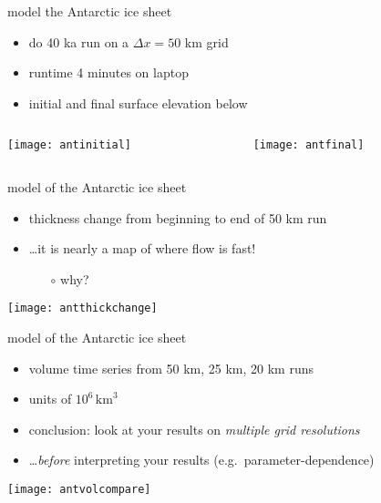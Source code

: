 \begin{frame}{model the Antarctic ice sheet }

\begin{itemize}
\item do 40 ka run on a $\Delta x=50$ km grid
\item runtime 4 minutes on laptop
\item initial and final surface elevation below
\end{itemize}

\bigskip
\begin{columns}
\begin{column}{0.4\textwidth}
\texttt{[image: antinitial]}
\end{column}
\begin{column}{0.55\textwidth}
\texttt{[image: antfinal]}
\end{column}
\end{columns}
\end{frame}


\begin{frame}{model of the Antarctic ice sheet }

\normalsize
\vspace{-5mm}
\begin{itemize}
\item thickness change from beginning to end of 50 km run
\item \dots it is nearly a map of where flow is fast!
  \begin{itemize}
  \item[$\circ$] why?
  \end{itemize}  
\end{itemize}

\begin{center}
\texttt{[image: antthickchange]}
\end{center}
\end{frame}


\begin{frame}{model of the Antarctic ice sheet }

\normalsize
\begin{itemize}
\item volume time series from {\color{red} 50 km}, {\color{green} 25 km}, {\color{blue} 20 km} runs
\item units of $10^6\,\text{km}^3$
\item conclusion:  look at your results on \emph{multiple grid resolutions}
\item \dots \emph{before} interpreting your results (e.g.~parameter-dependence)
\end{itemize}

\bigskip
\begin{center}
\texttt{[image: antvolcompare]}
\end{center}
\end{frame}


